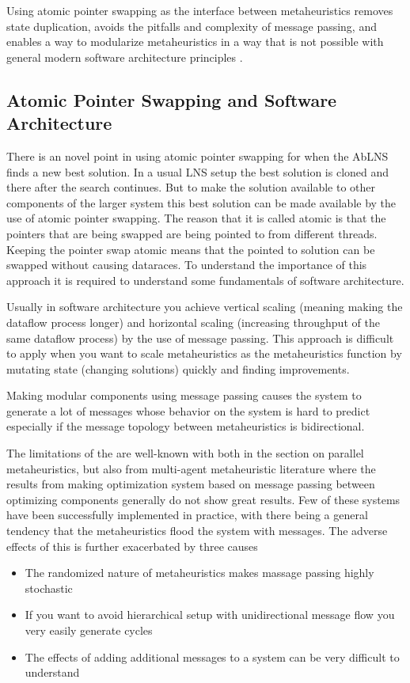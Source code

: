 Using atomic pointer swapping as the interface between metaheuristics removes 
state duplication, avoids the pitfalls and complexity 
of message passing, and enables a way to modularize metaheuristics in a way
that is not possible with general modern software architecture principles
\citep{richards_fundamentals_2020}. 

\subsection{Atomic Pointer Swapping and Software Architecture}
There is an novel point in using atomic pointer swapping for when the 
AbLNS finds a new best solution. In a usual LNS setup the best solution is 
cloned and there after the search continues. But to make the solution available
to other components of the larger system this best solution can be made available
by the use of atomic pointer swapping. The reason that it is called atomic is
that the pointers that are being swapped are being pointed to from different 
threads. Keeping the pointer swap atomic means that the pointed to solution
can be swapped without causing dataraces. To understand the importance of this
approach it is required to understand some fundamentals of software architecture.

Usually in software architecture you achieve vertical scaling (meaning making the 
dataflow process longer) and horizontal scaling (increasing throughput of the
same dataflow process) by the use of message passing. This approach is difficult
to apply when you want to scale metaheuristics as the metaheuristics function
by mutating state (changing solutions) quickly and finding improvements. 

Making modular components using message passing causes the system to generate 
a lot of messages whose behavior on the system is hard to predict especially
if the message topology between metaheuristics is bidirectional.

The limitations of the are well-known with both \citep{talbiMetaheuristicsDesignImplementation2009} 
in the section on parallel metaheuristics, but also from multi-agent metaheuristic
literature where the results from making optimization system based on message 
passing between optimizing components generally do not show great results.
Few of these systems have been successfully implemented in practice, with
there being a general tendency that the metaheuristics flood the system with
messages. The adverse effects of this is further exacerbated by three causes
\begin{itemize}
	\item The randomized nature of metaheuristics makes massage passing highly
		stochastic 
	\item If you want to avoid hierarchical setup with unidirectional message flow
		you very easily generate cycles
	\item The effects of adding additional messages to a system can be very 
		difficult to understand
\end{itemize}

